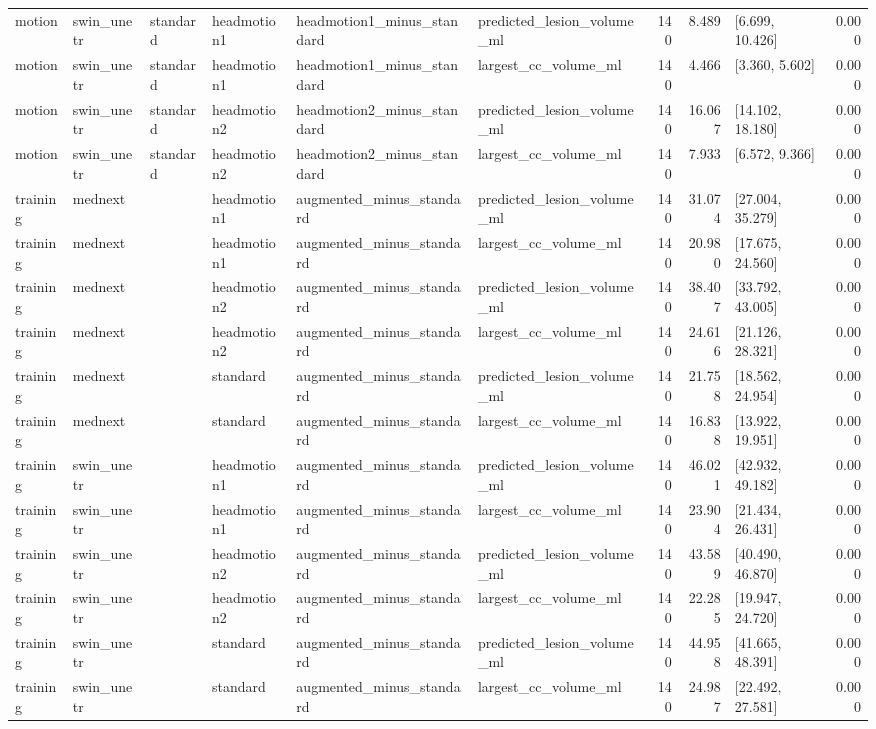 \begin{table}
\begin{tabular}{llllllrrlr}
motion & swin\_unetr & standard & headmotion1 & headmotion1\_minus\_standard & predicted\_lesion\_volume\_ml & 140 & 8.489 & [6.699, 10.426] & 0.000 \\
motion & swin\_unetr & standard & headmotion1 & headmotion1\_minus\_standard & largest\_cc\_volume\_ml & 140 & 4.466 & [3.360, 5.602] & 0.000 \\
motion & swin\_unetr & standard & headmotion2 & headmotion2\_minus\_standard & predicted\_lesion\_volume\_ml & 140 & 16.067 & [14.102, 18.180] & 0.000 \\
motion & swin\_unetr & standard & headmotion2 & headmotion2\_minus\_standard & largest\_cc\_volume\_ml & 140 & 7.933 & [6.572, 9.366] & 0.000 \\
training & mednext &  & headmotion1 & augmented\_minus\_standard & predicted\_lesion\_volume\_ml & 140 & 31.074 & [27.004, 35.279] & 0.000 \\
training & mednext &  & headmotion1 & augmented\_minus\_standard & largest\_cc\_volume\_ml & 140 & 20.980 & [17.675, 24.560] & 0.000 \\
training & mednext &  & headmotion2 & augmented\_minus\_standard & predicted\_lesion\_volume\_ml & 140 & 38.407 & [33.792, 43.005] & 0.000 \\
training & mednext &  & headmotion2 & augmented\_minus\_standard & largest\_cc\_volume\_ml & 140 & 24.616 & [21.126, 28.321] & 0.000 \\
training & mednext &  & standard & augmented\_minus\_standard & predicted\_lesion\_volume\_ml & 140 & 21.758 & [18.562, 24.954] & 0.000 \\
training & mednext &  & standard & augmented\_minus\_standard & largest\_cc\_volume\_ml & 140 & 16.838 & [13.922, 19.951] & 0.000 \\
training & swin\_unetr &  & headmotion1 & augmented\_minus\_standard & predicted\_lesion\_volume\_ml & 140 & 46.021 & [42.932, 49.182] & 0.000 \\
training & swin\_unetr &  & headmotion1 & augmented\_minus\_standard & largest\_cc\_volume\_ml & 140 & 23.904 & [21.434, 26.431] & 0.000 \\
training & swin\_unetr &  & headmotion2 & augmented\_minus\_standard & predicted\_lesion\_volume\_ml & 140 & 43.589 & [40.490, 46.870] & 0.000 \\
training & swin\_unetr &  & headmotion2 & augmented\_minus\_standard & largest\_cc\_volume\_ml & 140 & 22.285 & [19.947, 24.720] & 0.000 \\
training & swin\_unetr &  & standard & augmented\_minus\_standard & predicted\_lesion\_volume\_ml & 140 & 44.958 & [41.665, 48.391] & 0.000 \\
training & swin\_unetr &  & standard & augmented\_minus\_standard & largest\_cc\_volume\_ml & 140 & 24.987 & [22.492, 27.581] & 0.000 \\
\bottomrule
\end{tabular}
\end{table}
